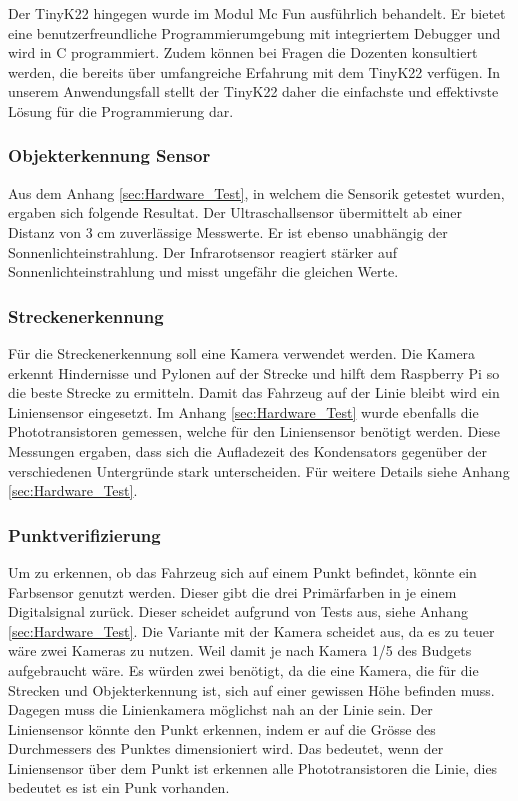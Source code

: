 \documentclass[../main.tex]{subfiles}
\begin{document}
    Der TinyK22 hingegen wurde im Modul Mc Fun ausführlich behandelt. Er bietet eine benutzerfreundliche Programmierumgebung mit integriertem Debugger und wird in C programmiert. Zudem können bei Fragen die Dozenten konsultiert werden, die bereits über umfangreiche Erfahrung mit dem TinyK22 verfügen. In unserem Anwendungsfall stellt der TinyK22 daher die einfachste und effektivste Lösung für die Programmierung dar.


\subsubsection{Objekterkennung Sensor}
\label{a3:Objekterkennung_Sensor}
 Aus dem Anhang \ref{sec:Hardware_Test}, in welchem die Sensorik getestet wurden, ergaben sich folgende Resultat. Der Ultraschallsensor übermittelt ab einer Distanz von 3 cm zuverlässige Messwerte. Er ist ebenso unabhängig der Sonnenlichteinstrahlung. Der Infrarotsensor reagiert stärker auf Sonnenlichteinstrahlung und misst ungefähr die gleichen Werte. 



\subsubsection{Streckenerkennung}
Für die Streckenerkennung soll eine Kamera verwendet werden. Die Kamera erkennt Hindernisse und Pylonen auf der Strecke und hilft dem Raspberry Pi so die beste Strecke zu ermitteln. Damit das Fahrzeug auf der Linie bleibt wird ein Liniensensor eingesetzt.  Im Anhang \ref{sec:Hardware_Test} wurde ebenfalls die Phototransistoren gemessen, welche für den Liniensensor benötigt werden. Diese Messungen ergaben, dass sich die Aufladezeit des Kondensators gegenüber der verschiedenen Untergründe stark unterscheiden. Für weitere Details siehe Anhang \ref{sec:Hardware_Test}. 

\subsubsection{Punktverifizierung}
Um zu erkennen, ob das Fahrzeug sich auf einem Punkt befindet, könnte ein Farbsensor genutzt werden. Dieser gibt die drei Primärfarben in je einem Digitalsignal zurück. Dieser scheidet aufgrund von Tests aus, siehe Anhang \ref{sec:Hardware_Test}. Die Variante mit der Kamera scheidet aus, da es zu teuer wäre zwei Kameras zu nutzen. Weil damit je nach Kamera 1/5 des Budgets aufgebraucht wäre. Es würden zwei benötigt, da die eine Kamera, die für die Strecken und Objekterkennung ist, sich auf einer gewissen Höhe befinden muss. Dagegen muss die Linienkamera möglichst nah an der Linie sein.
Der Liniensensor könnte den Punkt erkennen, indem er auf die Grösse des Durchmessers des Punktes dimensioniert wird. Das bedeutet, wenn der Liniensensor über dem Punkt ist erkennen alle Phototransistoren die Linie, dies bedeutet es ist ein Punk vorhanden. 
\end{document}
